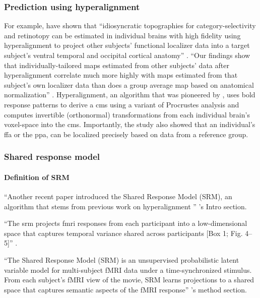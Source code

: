 \subsubsection{Prediction using hyperalignment}

%
For example, \citet{haxby2011common, guntupalli2016model} have shown that
``idiosyncratic topographies for category-selectivity and retinotopy can be
estimated in individual brains with high fidelity using hyperalignment to
project other subjects' functional localizer data into a target subject's
ventral temporal and occipital cortical anatomy'' \citep{jiahui2020predicting}.
%
``Our findings show that individually-tailored maps estimated from other
subjects’ data after hyperalignment correlate much more highly with maps
estimated from that subject's own localizer data than does a group average map
based on anatomical normalization'' \citep{jiahui2020predicting}.
%
Hyperalignment, an algorithm that was pioneered by \citet{haxby2011common}, uses
\ac{bold} response patterns to derive a \ac{cms} using a variant of Procrustes
analysis and computes invertible (orthonormal) transformations from each
individual brain's voxel-space into the \ac{cms}.
%
Importantly, the study also showed that an individual's \ac{ffa} or the
\ac{ppa}, can be localized precisely based on data from a reference group.


\subsubsection{Shared response model}

\paragraph{Definition of SRM}

``Another recent paper \citep{chen2015reduced} introduced the Shared Response
Model (SRM), an algorithm that stems from previous work on hyperalignment
\citep{haxby2011common}'' \citep{vodrahalli2018mapping}'s Intro
section.

``The \ac{srm} \citep{chen2015reduced} projects \ac{fmri} responses from
each participant into a low-dimensional space that captures temporal variance
shared across participants [Box 1; Fig. 4–5]'' \citep{cohen2017computational}.

``The Shared Response Model (SRM) \citep{chen2015reduced} is an unsupervised
probabilistic latent variable model for multi-subject fMRI data under a
time-synchronized stimulus. From each subject's fMRI view of the movie, SRM
learns projections to a shared space that captures semantic aspects of the
fMRI response'' \citep{vodrahalli2018mapping}'s method section.

